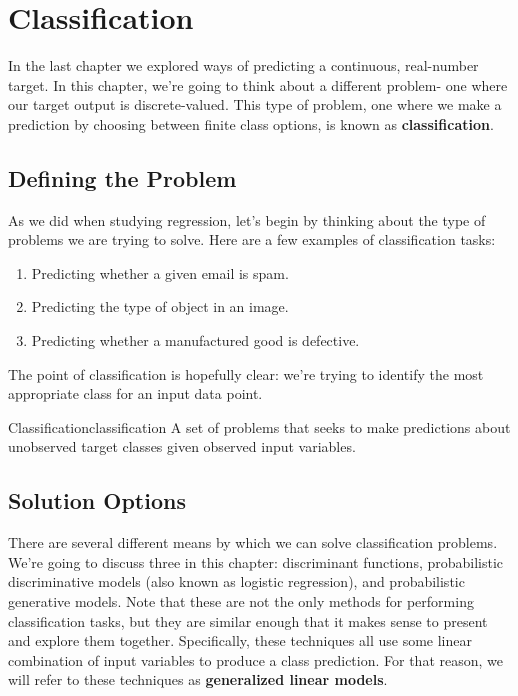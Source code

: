 \chapter{Classification}
In the last chapter we explored ways of predicting a continuous, real-number target. In this chapter, we're going to think about a different problem- one where our target output is discrete-valued. This type of problem, one where we make a prediction by choosing between finite class options, is known as \textbf{classification}.

\section{Defining the Problem}
As we did when studying regression, let's begin by thinking about the type of problems we are trying to solve. Here are a few examples of classification tasks:
\begin{enumerate}
    \item Predicting whether a given email is spam.
    \item Predicting the type of object in an image.
    \item Predicting whether a manufactured good is defective.
\end{enumerate}
The point of classification is hopefully clear: we're trying to identify the most appropriate class for an input data point.
\begin{definition}{Classification}{classification}
A set of problems that seeks to make predictions about unobserved target classes given observed input variables.
\end{definition}

\section{Solution Options}

There are several different means by which we can solve classification problems. We're going to discuss three in this chapter: discriminant functions, probabilistic discriminative models (also known as logistic regression), and probabilistic generative models. Note that these are not the only methods for performing classification tasks, but they are similar enough that it makes sense to present and explore them together. Specifically, these techniques all use some linear combination of input variables to produce a class prediction. For that reason, we will refer to these techniques as \textbf{generalized linear models}.

